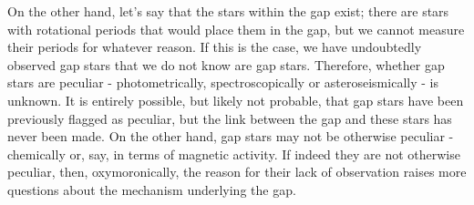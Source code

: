 On the other hand, let's say that the stars within the gap exist; there are stars with rotational periods that would place them in the gap, but we cannot measure their periods for whatever reason.
If this is the case, we have undoubtedly observed gap stars that we do not know are gap stars.
Therefore, whether gap stars are peculiar - photometrically, spectroscopically or asteroseismically - is unknown.
It is entirely possible, but likely not probable, that gap stars have been previously flagged as peculiar, but the link between the gap and these stars has never been made.
On the other hand, gap stars may not be otherwise peculiar - chemically or, say, in terms of magnetic activity.
If indeed they are not otherwise peculiar, then, oxymoronically, the reason for their lack of observation raises more questions about the mechanism underlying the gap.


